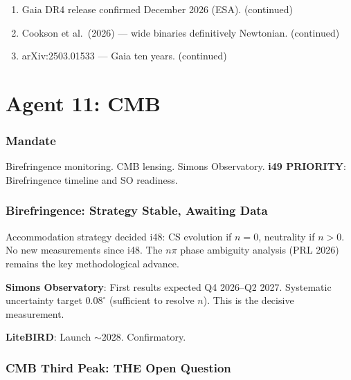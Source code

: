 \documentclass[11pt,a4paper]{article}
\begin{document}
\begin{enumerate}
\item Gaia DR4 release confirmed December 2026 (ESA). (continued)
\item Cookson et al.\ (2026) --- wide binaries definitively Newtonian. (continued)
\item arXiv:2503.01533 --- Gaia ten years. (continued)
\end{enumerate}


\part{Agent 11: CMB}
\label{part:agent11}

\section{Mandate}

Birefringence monitoring. CMB lensing. Simons Observatory. \textbf{i49 PRIORITY}: Birefringence timeline and SO readiness.

\section{Birefringence: Strategy Stable, Awaiting Data}

Accommodation strategy decided i48: CS evolution if $n = 0$, neutrality if $n > 0$. No new measurements since i48. The $n\pi$ phase ambiguity analysis (PRL 2026) remains the key methodological advance.

\textbf{Simons Observatory}: First results expected Q4 2026--Q2 2027. Systematic uncertainty target $0.08^\circ$ (sufficient to resolve $n$). This is the decisive measurement.

\textbf{LiteBIRD}: Launch $\sim$2028. Confirmatory.

\section{CMB Third Peak: THE Open Question}
\end{document}
